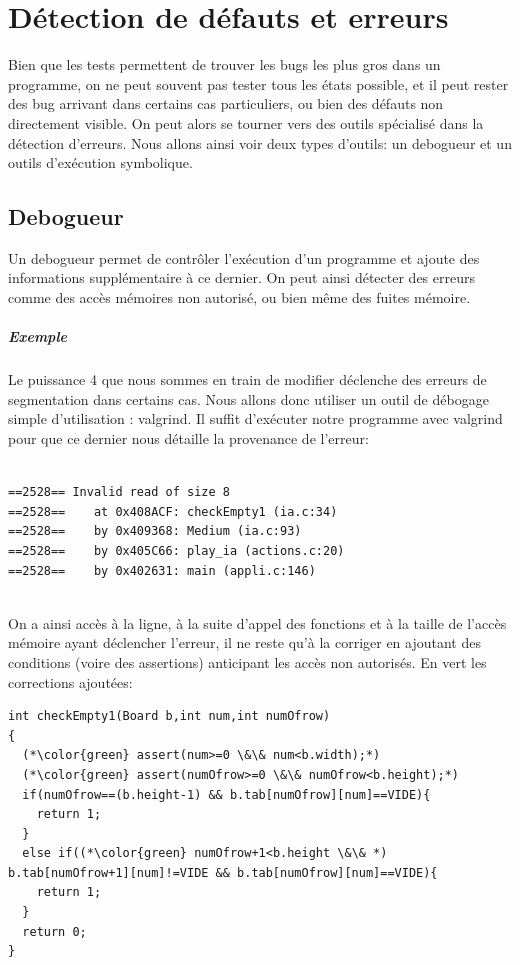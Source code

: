 \documentclass{report}
\begin{document}
\chapter{Détection de défauts et erreurs}
Bien que les tests permettent de trouver les bugs les plus gros dans un programme, on ne peut souvent pas tester tous les états possible, et il peut rester des bug arrivant dans certains cas particuliers, ou bien des défauts non directement visible. On peut alors se tourner vers des outils spécialisé dans la détection d'erreurs. Nous allons ainsi voir deux types d'outils: un debogueur et un outils d'exécution symbolique.
\section{Debogueur}
Un debogueur permet de contrôler l'exécution d'un programme et ajoute des informations supplémentaire à ce dernier. On peut ainsi détecter des erreurs comme des accès mémoires non autorisé, ou bien même des fuites mémoire.
\paragraph{Exemple}
Le puissance 4 que nous sommes en train de modifier déclenche des erreurs de segmentation dans certains cas. Nous allons donc utiliser un outil de débogage simple d'utilisation : valgrind. Il suffit d'exécuter notre programme avec valgrind pour que ce dernier nous détaille la provenance de l'erreur:

\begin{scriptsize}
  \begin{lstlisting}

==2528== Invalid read of size 8
==2528==    at 0x408ACF: checkEmpty1 (ia.c:34)
==2528==    by 0x409368: Medium (ia.c:93)
==2528==    by 0x405C66: play_ia (actions.c:20)
==2528==    by 0x402631: main (appli.c:146)
    
  \end{lstlisting}
\end{scriptsize}

On a ainsi accès à la ligne, à la suite d'appel des fonctions et à la taille de l'accès mémoire ayant déclencher l'erreur, il ne reste qu'à la corriger en ajoutant des conditions (voire des assertions) anticipant les accès non autorisés. En vert les corrections ajoutées:

\begin{scriptsize}
  \begin{lstlisting}
int checkEmpty1(Board b,int num,int numOfrow)
{
  (*\color{green} assert(num>=0 \&\& num<b.width);*)
  (*\color{green} assert(numOfrow>=0 \&\& numOfrow<b.height);*)
  if(numOfrow==(b.height-1) && b.tab[numOfrow][num]==VIDE){
    return 1;
  }
  else if((*\color{green} numOfrow+1<b.height \&\& *) b.tab[numOfrow+1][num]!=VIDE && b.tab[numOfrow][num]==VIDE){
    return 1;
  }
  return 0;
}
  \end{lstlisting}
\end{scriptsize}
\end{document}
